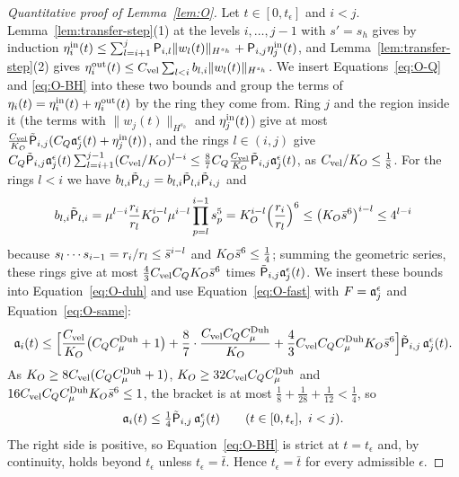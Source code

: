 \begin{proof}[Quantitative proof of Lemma~\ref{lem:O}]
Let $t\in[0,t_\epsilon]$ and $i<j$. Lemma~\ref{lem:transfer-step}(1)
at the levels $i,\dots,j-1$ with $s'=s_h$ gives by induction
$\eta^{\mathrm{in}}_i(t)\le\sum_{l=i+1}^{j}\mathsf{P}_{i,l}\|w_l(t)\|_{H^{s_h}}+\mathsf{P}_{i,j}\eta^{\mathrm{in}}_j(t)$,
and Lemma~\ref{lem:transfer-step}(2) gives
$\eta^{\mathrm{out}}_i(t)\le C_{\mathrm{vel}} \sum_{l<i}b_{l,i}\|w_l(t)\|_{H^{s_h}}$. We insert
Equations~\eqref{eq:O-Q} and \eqref{eq:O-BH} into these two bounds and group the
terms of $\eta_i(t)=\eta^{\mathrm{in}}_i(t)+\eta^{\mathrm{out}}_i(t)$ by the ring they come from.
Ring $j$ and the region inside it (the terms with $\|w_j(t)\|_{H^{s_h}}$ and
$\eta^{\mathrm{in}}_j(t)$) give
at most $\frac{C_{\mathrm{vel}}}{K_{O}}\tilde{\mathsf{P}}_{i,j}(C_Q\mathfrak{a}^\epsilon_j(t)+\eta^{\mathrm{in}}_j(t))$, and the
rings $l\in(i,j)$ give
$C_Q\tilde{\mathsf{P}}_{i,j}\mathfrak{a}^\epsilon_j(t)\sum_{l=i+1}^{j-1}(C_{\mathrm{vel}} /K_{O})^{l-i}\le\frac87C_Q\frac{C_{\mathrm{vel}}}{K_{O}}\tilde{\mathsf{P}}_{i,j}\mathfrak{a}^\epsilon_j(t)$,
as $C_{\mathrm{vel}} /K_{O}\le\frac18$. For the rings $l<i$ we have
$b_{l,i}\tilde{\mathsf{P}}_{l,j}=b_{l,i}\tilde{\mathsf{P}}_{l,i}\tilde{\mathsf{P}}_{i,j}$ and
\[
b_{l,i}\tilde{\mathsf{P}}_{l,i}=\mu^{l-i}\frac{r_i}{r_l}K_{O}^{i-l}\mu^{i-l}\prod_{p=l}^{i-1}s_p^5
=K_{O}^{i-l}\Big(\frac{r_i}{r_l}\Big)^6\le\big(K_{O}\bar s^6\big)^{i-l}\le4^{l-i}
\]
because $s_l\cdots s_{i-1}=r_i/r_l\le\bar s^{i-l}$ and $K_{O}\bar s^6\le\frac14$;
summing the geometric series, these rings give at most $\frac43C_{\mathrm{vel}} C_QK_{O}\bar s^6$ times $\tilde{\mathsf{P}}_{i,j}\mathfrak{a}^\epsilon_j(t)$. We insert
these bounds into Equation~\eqref{eq:O-duh} and use Equation~\eqref{eq:O-fast}
with $F=\mathfrak{a}^\epsilon_j$ and Equation~\eqref{eq:O-same}:
\[
\mathfrak{a}_i(t)\le\Big[\frac{C_{\mathrm{vel}}}{K_{O}}\big(C_QC^{\mathrm{Duh}}_\mu+1\big)+\frac87\cdot\frac{C_{\mathrm{vel}} C_QC^{\mathrm{Duh}}_\mu}{K_{O}}+\frac43C_{\mathrm{vel}} C_QC^{\mathrm{Duh}}_\mu K_{O}\bar s^6\Big]\tilde{\mathsf{P}}_{i,j}\,\mathfrak{a}^\epsilon_j(t).
\]
As $K_{O}\ge8C_{\mathrm{vel}} (C_QC^{\mathrm{Duh}}_\mu+1)$, $K_{O}\ge32C_{\mathrm{vel}} C_QC^{\mathrm{Duh}}_\mu$ and
$16C_{\mathrm{vel}} C_QC^{\mathrm{Duh}}_\mu K_{O}\bar s^6\le1$, the bracket is at most
$\frac18+\frac1{28}+\frac1{12}<\frac14$, so
\begin{equation}
\label{eq:O-improved}
\maj_i(t)\le\tfrac14\Ptil_{i,j}\,\maj^\epsilon_j(t)\qquad(t\in[0,t_\epsilon],\ i<j).
\end{equation}
The right side is positive, so Equation~\eqref{eq:O-BH} is strict at
$t=t_\epsilon$ and, by continuity, holds beyond $t_\epsilon$ unless
$t_\epsilon=\bar t$. Hence $t_\epsilon=\bar t$ for every admissible $\epsilon$.


\end{proof}

